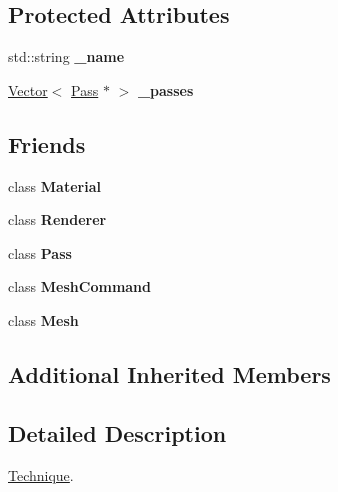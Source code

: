 \subsection*{Protected Attributes}
\begin{DoxyCompactItemize}
\item 
\mbox{\label{classTechnique_adaee2bdccd237243b499ffaf09e13291}} 
std\+::string {\bfseries \+\_\+name}
\item 
\mbox{\label{classTechnique_af7fe79a3621d07d8636758225fd226b1}} 
\hyperlink{classVector}{Vector}$<$ \hyperlink{classPass}{Pass} $\ast$ $>$ {\bfseries \+\_\+passes}
\end{DoxyCompactItemize}
\subsection*{Friends}
\begin{DoxyCompactItemize}
\item 
\mbox{\label{classTechnique_a76b09dbbfd6aad2807be6181db6bd2e4}} 
class {\bfseries Material}
\item 
\mbox{\label{classTechnique_a7482e5338f9824f1190a0846d209c666}} 
class {\bfseries Renderer}
\item 
\mbox{\label{classTechnique_abe77423eb27f643233ef051559a64882}} 
class {\bfseries Pass}
\item 
\mbox{\label{classTechnique_a9f8d65c15f716e15a8acedb603ab047b}} 
class {\bfseries Mesh\+Command}
\item 
\mbox{\label{classTechnique_ac9b3996998332cf8a503b4fbcaa6b200}} 
class {\bfseries Mesh}
\end{DoxyCompactItemize}
\subsection*{Additional Inherited Members}


\subsection{Detailed Description}
\hyperlink{classTechnique}{Technique}. 

